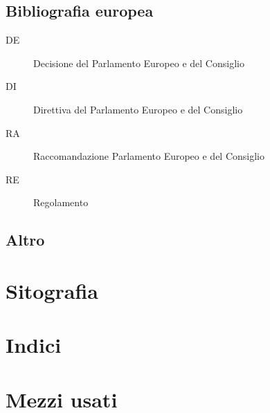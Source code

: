 \documentclass[a4paper]{book}%
\begin{document}
 \section{Bibliografia europea}
 \begin{description}
 	\item[DE] Decisione del Parlamento Europeo e del Consiglio
 	\item[DI] Direttiva del Parlamento Europeo e del Consiglio
 	\item[RA] Raccomandazione Parlamento Europeo e del Consiglio
 	\item[RE] Regolamento
 \end{description}
\printbibliography[keyword=EU,heading=subbibliography]
\section{Altro}
\printbibliography[keyword=EXTRA, heading=subbibliography]
\printbibliography[keyword=BOOK,title={Pubblicazioni}]
\chapter{Sitografia}
\printbibliography[keyword=WWW,type=online,restoreclassic,annotation=false,heading=subbibliography,title={Siti}]

\chapter{Indici}
\printindex
\printindex[due]
\backmatter
\appendix

\chapter{Mezzi usati}
\CDMezziUsati
\end{document}
